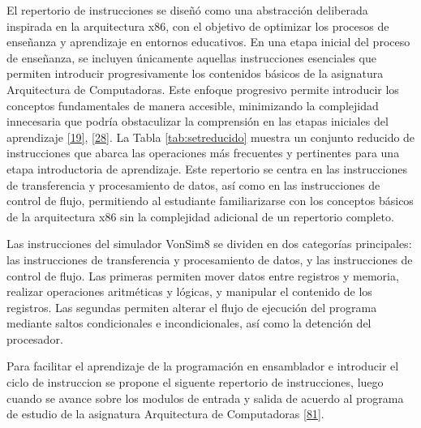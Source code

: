 \documentclass[12pt,oneside]{templates/unerthesis}
\begin{document}
El repertorio de instrucciones se diseñó como una abstracción deliberada inspirada en la arquitectura x86, con el objetivo de optimizar los procesos de enseñanza y aprendizaje en entornos educativos. En una etapa inicial del proceso de enseñanza, se incluyen únicamente aquellas instrucciones esenciales que permiten introducir progresivamente los contenidos básicos de la asignatura Arquitectura de Computadoras. Este enfoque progresivo permite introducir los conceptos fundamentales de manera accesible, minimizando la complejidad innecesaria que podría obstaculizar la comprensión en las etapas iniciales del aprendizaje \protect\hyperlink{ref-hennessy2017computer}{{[}19{]}}, \protect\hyperlink{ref-tanenbaum_structured_2016}{{[}28{]}}. La Tabla \ref{tab:setreducido} muestra un conjunto reducido de instrucciones que abarca las operaciones más frecuentes y pertinentes para una etapa introductoria de aprendizaje. Este repertorio se centra en las instrucciones de transferencia y procesamiento de datos, así como en las instrucciones de control de flujo, permitiendo al estudiante familiarizarse con los conceptos básicos de la arquitectura x86 sin la complejidad adicional de un repertorio completo.

Las instrucciones del simulador VonSim8 se dividen en dos categorías principales: las instrucciones de transferencia y procesamiento de datos, y las instrucciones de control de flujo. Las primeras permiten mover datos entre registros y memoria, realizar operaciones aritméticas y lógicas, y manipular el contenido de los registros. Las segundas permiten alterar el flujo de ejecución del programa mediante saltos condicionales e incondicionales, así como la detención del procesador.

Para facilitar el aprendizaje de la programación en ensamblador e introducir el ciclo de instruccion se propone el siguente repertorio de instrucciones, luego cuando se avance sobre los modulos de entrada y salida de acuerdo al programa de estudio de la asignatura Arquitectura de Computadoras \protect\hyperlink{ref-cd023_25_programa2025}{{[}81{]}}.
\end{document}
